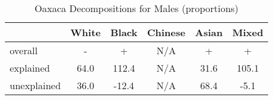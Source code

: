 \begin{table}[htbp]\centering
\caption{Oaxaca Decompositions for Males (proportions)}
\begin{tabular}{l*{5}{c}}
\hline\hline
          &    White&    Black&  Chinese&    Asian&    Mixed\\
\hline
overall   &    -     &    +     &    N/A     &    +     &     +    \\
explained &     64.0&    112.4&    N/A&     31.6&    105.1\\
unexplained&     36.0&    -12.4&   N/A&     68.4&     -5.1\\
\hline\hline
\end{tabular}
\label{tab:oaxaca_pct_male}
\end{table}
